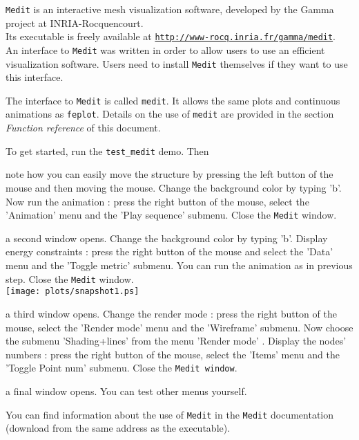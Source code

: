 
{\tt Medit} is an interactive mesh visualization software, developed by the Gamma project at INRIA-Rocquencourt.\\
Its executable is freely available at \href{http://www-rocq.inria.fr/gamma/medit}{{\tt http://www-rocq.inria.fr/gamma/medit}}.\\
An interface to {\tt Medit} was written in order to allow users to use an efficient visualization software. Users need to install {\tt Medit} themselves if they want to use this interface. 

The interface to {\tt Medit} is called {\tt medit}. It allows the same plots and continuous animations as {\tt feplot}. Details on the use of {\tt medit} are provided in the section \emph{Function reference} of this document. 

To get started, run the  {\tt test\_medit} demo. Then 

\begin{Eitem}
\item note how you can easily move the structure by pressing the left button of the mouse and then moving the mouse. Change the background color by typing 'b'. Now run the animation : press the right button of the mouse, select the 'Animation' menu and the 'Play sequence' submenu. Close the {\tt Medit} window.
\item a second window opens. Change the background color by typing 'b'. Display energy constraints : press the right button of the mouse and select the 'Data' menu and the 'Toggle metric' submenu. You can run the animation as in  previous step. Close the {\tt Medit} window.\\
$ $\\
\texttt{[image: plots/snapshot1.ps]}
\item a third window opens. Change the render mode : press the right button of the mouse, select the 'Render mode' menu and the 'Wireframe' submenu. Now choose the submenu 'Shading+lines' from the menu 'Render mode' . Display the nodes' numbers : press the right button of the mouse, select the 'Items' menu and the 'Toggle Point num' submenu. Close the {\tt Medit window}.
\item a final window opens. You can test other menus yourself.
\end{Eitem}
You can find information about the use of {\tt Medit} in the {\tt Medit} documentation (download from the same address as the executable). 